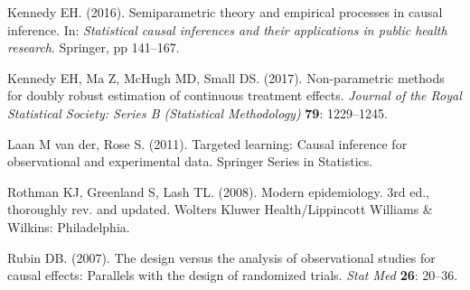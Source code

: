\documentclass[]{article}
\begin{document}
\leavevmode\hypertarget{ref-kennedy2016}{}%
Kennedy EH. (2016). Semiparametric theory and empirical processes in
causal inference. In: \emph{Statistical causal inferences and their
applications in public health research}. Springer, pp 141--167.

\leavevmode\hypertarget{ref-kennedy2017}{}%
Kennedy EH, Ma Z, McHugh MD, Small DS. (2017). Non-parametric methods
for doubly robust estimation of continuous treatment effects.
\emph{Journal of the Royal Statistical Society: Series B (Statistical
Methodology)} \textbf{79}: 1229--1245.

\leavevmode\hypertarget{ref-van2011}{}%
Laan M van der, Rose S. (2011). Targeted learning: Causal inference for
observational and experimental data. Springer Series in Statistics.

\leavevmode\hypertarget{ref-Rothman2008}{}%
Rothman KJ, Greenland S, Lash TL. (2008). Modern epidemiology. 3rd ed.,
thoroughly rev. and updated. Wolters Kluwer Health/Lippincott Williams
\& Wilkins: Philadelphia.

\leavevmode\hypertarget{ref-Rubin2007}{}%
Rubin DB. (2007). The design versus the analysis of observational
studies for causal effects: Parallels with the design of randomized
trials. \emph{Stat Med} \textbf{26}: 20--36.
\end{document}
